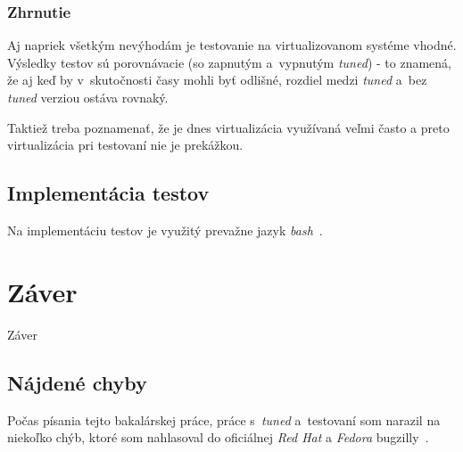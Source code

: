 \subsection{Zhrnutie}

Aj napriek všetkým nevýhodám je testovanie na virtualizovanom systéme vhodné.
Výsledky testov sú porovnávacie (so zapnutým a~vypnutým \emph{tuned}) - to
znamená, že aj keď by v~skutočnosti časy mohli byť odlišné, rozdiel medzi
\emph{tuned} a~bez \emph{tuned} verziou ostáva rovnaký.

Taktiež treba poznamenať, že je dnes virtualizácia využívaná veľmi často a
preto virtualizácia pri testovaní nie je prekážkou.

%
%

\section{Implementácia testov}

Na implementáciu testov je využitý prevažne jazyk \emph{bash}~\cite{bash}. 



\chapter{Záver}
Záver

%
%

\section{Nájdené chyby}

Počas písania tejto bakalárskej práce, práce s~\emph{tuned} a~testovaní som
narazil na niekoľko chýb, ktoré som nahlasoval do oficiálnej \emph{Red Hat} a
\emph{Fedora} bugzilly~\cite{rhBugzilla}.


